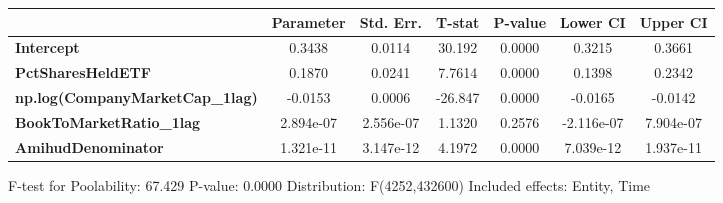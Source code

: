 \begin{center}
\begin{tabular}{lclc}
\bottomrule
\end{tabular}
\begin{tabular}{lcccccc}
                                        & \textbf{Parameter} & \textbf{Std. Err.} & \textbf{T-stat} & \textbf{P-value} & \textbf{Lower CI} & \textbf{Upper CI}  \\
\midrule
\textbf{Intercept}                      &       0.3438       &       0.0114       &      30.192     &      0.0000      &       0.3215      &       0.3661       \\
\textbf{PctSharesHeldETF}               &       0.1870       &       0.0241       &      7.7614     &      0.0000      &       0.1398      &       0.2342       \\
\textbf{np.log(CompanyMarketCap\_1lag)} &      -0.0153       &       0.0006       &     -26.847     &      0.0000      &      -0.0165      &      -0.0142       \\
\textbf{BookToMarketRatio\_1lag}        &     2.894e-07      &     2.556e-07      &      1.1320     &      0.2576      &     -2.116e-07    &     7.904e-07      \\
\textbf{AmihudDenominator}              &     1.321e-11      &     3.147e-12      &      4.1972     &      0.0000      &     7.039e-12     &     1.937e-11      \\
\bottomrule
\end{tabular}
\end{center}

F-test for Poolability: 67.429 \newline
 P-value: 0.0000 \newline
 Distribution: F(4252,432600) \newline
  \newline
 Included effects: Entity, Time